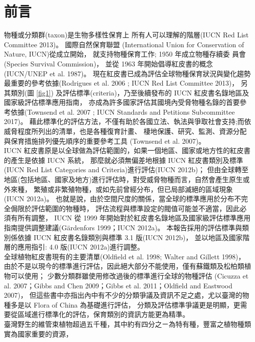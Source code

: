 \chapter{前言}

\linespread{1.5}\selectfont
\begin{multicols}{2}
物種或分類群(taxon)是生物多樣性保育上 所有人可以理解的階層(IUCN Red List Committee 2013)。
國際自然保育聯盟 (International Union for Conservation of Nature, IUCN)從成立開始，
就支持物種保育工作; 1950 年成立物種存續委 員會(Species Survival Commission)，
並從 1963 年開始倡導紅皮書的概念(IUCN/UNEP et al. 1987)。
現在紅皮書已成為評估全球物種保育狀況與變化趨勢最重要的參考依據(Rodrigues et al. 2006 ; IUCN Red List Committee 2013)，
另其類別(圖 \ref{fig1}) 及評估標準(criteria)，乃至後續發布的 IUCN 紅皮書名錄地區及國家級評估標準應用指南，
亦成為許多國家評估其國境內受脅物種名錄的首要參考依據(Townsend et al. 2007 ; IUCN Standards and Petitions Subcommittee 2017)。
藉此標準化的評估方法，不僅有助於各國立法、執法與爭取社會支持;而依威脅程度所列出的清單，也是各種復育計畫、
棲地保護、研究、監測、資源分配與保育措施排列優先順序的重要參考工具 (Townsend et al. 2007)。\\
\indent IUCN 紅皮書原是以全球做為評估範圍的，如果一個地區、國家或地方性的紅皮書的產生是依據 IUCN 系統，
那麼就必須無偏差地根據 IUCN 紅皮書類別及標準(IUCN Red List Categories and Criteria)進行評估(IUCN 2012b)；
但由全球轉至地區(包括地區、國家及地方)進行評估時，對受威脅物種而言，自然會產生原生或外來種，
繁殖或非繁殖物種，或如先前曾經分布，但已局部滅絕的區域現象(IUCN 2012a)。
也就是說，由於空間尺度的關係，當全球的標準應用於分布不完全侷限於評估範圍的物種時，
評估流程與標準設定的閥值可能並不適當，因此必須有所有調整，
IUCN 從 1999 年開始對於紅皮書名錄地區及國家級評估標準應用指南提供調整建議(Gärdenfors 1999；IUCN 2012a)。
本報告採用的評估標準與類別係依據 IUCN 紅皮書名錄類別與標準 3.1 版(IUCN 2012b)，
並以地區及國家階層的應用指引: 4.0 版(IUCN 2012a)進行調整。\\
\indent 全球植物紅皮書現有的主要清單(Oldfield et al. 1998; Walter and Gillett 1998)，
由於不是以現今的標準進行評估，因此絕大部分不能使用，僅有蘇鐵類及松柏類植物可以使用；
少數分類群雖使用修改過後的標準進行全球的物種評估
(Cicuzza et al. 2007；Gibbs and Chen 2009；Gibbs et al. 2011；Oldfield and Eastwood 2007)，
但這些書中亦指出內中有不少的分類爭議及資訊不足之處，尤以臺灣的物種多是以 Flora of China 為基礎進行評估，
分類及評估標準爭議更是明顯，更需要從區域進行標準化的評估，保育類別的資訊方能更為精準。 \\
\indent 臺灣野生的維管束植物超過五千種，其中約有四分之ㄧ為特有種，豐富之植物種類實為國家重要的資源，

\end{multicols}
